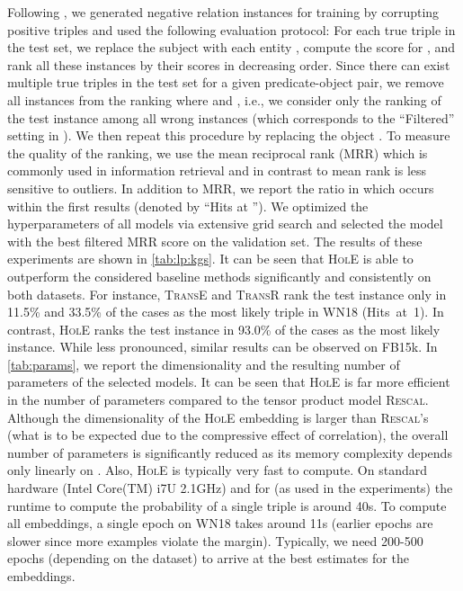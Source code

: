 \documentclass[letterpaper]{article}
\newcommand{\hole}{\textsc{HolE}\xspace}
\newcommand{\transe}{\textsc{TransE}\xspace}
\newcommand{\transr}{\textsc{TransR}\xspace}
\newcommand{\rescal}{\textsc{Rescal}\xspace}
\begin{document}
Following \citet{bordes2013translating}, we generated negative relation
instances for training by corrupting positive triples and used the
following evaluation protocol: For each true triple 
in the test set, we replace the subject  with each entity , compute the score for , and rank all these instances
by their scores in decreasing order. Since there can exist multiple true
triples in the test set for a given predicate-object pair, we remove
all instances from the ranking where  and , i.e., we consider only the ranking of the test
instance among all wrong instances (which corresponds to the ``Filtered''
setting in \citet{bordes2013translating}). We then repeat this procedure by
replacing the object . To measure the quality of the ranking, we use the
mean reciprocal rank (MRR) which is commonly used in information retrieval
and in contrast to mean rank is less sensitive to outliers.
In addition to MRR, we report the ratio in which 
occurs within the first  results (denoted by ``Hits at '').
We optimized the hyperparameters of all models via extensive grid search and
selected the model with the best filtered MRR score on the validation set.
The results of these experiments are shown in \cref{tab:lp:kgs}.
It can be seen that \hole is able to outperform the considered baseline methods
significantly and consistently on both datasets. For instance, \transe and
\transr rank the test instance only in 11.5\% and 33.5\% of the cases as the
most likely triple in WN18 (\mbox{Hits at 1}). In contrast, \hole ranks the test
instance in 93.0\% of the cases as the most likely instance. While less
pronounced, similar results can be observed on FB15k.
In \cref{tab:params}, we report the dimensionality  and the resulting
number of parameters of the selected models. It can be seen that \hole is far
more efficient in the number of parameters compared to the tensor product model
\rescal. Although the dimensionality  of the \hole embedding is larger than
\textsc{Rescal}'s (what is to be expected due to the compressive effect of
correlation), the overall number of parameters is significantly reduced as its
memory complexity depends only linearly on .
Also, \hole is typically very fast to compute. On standard hardware (Intel
Core(TM) i7U 2.1GHz) and for  (as used in the experiments) the runtime to
compute the probability of a single triple is around 40s. To compute all
embeddings, a single epoch on WN18 takes around 11s (earlier epochs are slower
since more examples violate the margin). Typically, we need 200-500 epochs
(depending on the dataset) to arrive at the best estimates for the embeddings.
\end{document}
